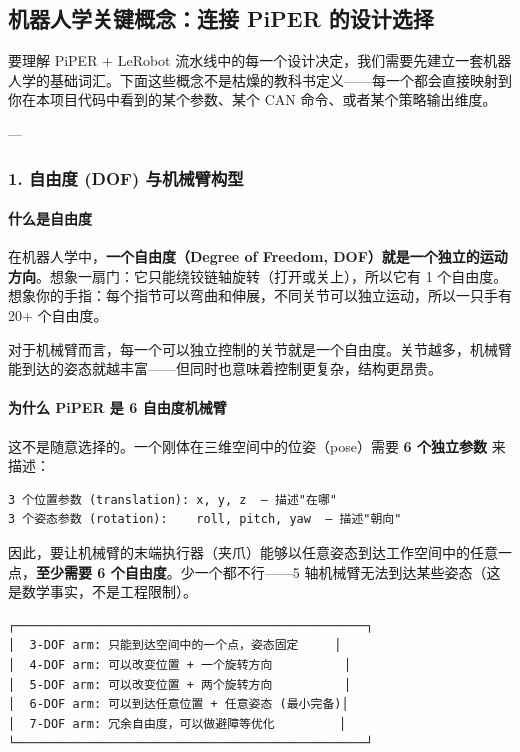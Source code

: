 \documentclass[UTF8,a4paper,11pt]{ctexart}
\begin{document}
\subsection{机器人学关键概念：连接 PiPER 的设计选择}

要理解 PiPER + LeRobot 流水线中的每一个设计决定，我们需要先建立一套机器人学的基础词汇。下面这些概念不是枯燥的教科书定义——每一个都会直接映射到你在本项目代码中看到的某个参数、某个 CAN 命令、或者某个策略输出维度。

---

\subsubsection{1. 自由度 (DOF) 与机械臂构型}

\paragraph{什么是自由度}


在机器人学中，\textbf{一个自由度（Degree of Freedom, DOF）就是一个独立的运动方向}。想象一扇门：它只能绕铰链轴旋转（打开或关上），所以它有 1 个自由度。想象你的手指：每个指节可以弯曲和伸展，不同关节可以独立运动，所以一只手有 20+ 个自由度。

对于机械臂而言，每一个可以独立控制的关节就是一个自由度。关节越多，机械臂能到达的姿态就越丰富——但同时也意味着控制更复杂，结构更昂贵。

\paragraph{为什么 PiPER 是 6 自由度机械臂}


这不是随意选择的。一个刚体在三维空间中的位姿（pose）需要 \textbf{6 个独立参数} 来描述：

\begin{lstlisting}[language=text]
3 个位置参数 (translation): x, y, z  — 描述"在哪"
3 个姿态参数 (rotation):    roll, pitch, yaw  — 描述"朝向"
\end{lstlisting}

因此，要让机械臂的末端执行器（夹爪）能够以任意姿态到达工作空间中的任意一点，\textbf{至少需要 6 个自由度}。少一个都不行——5 轴机械臂无法到达某些姿态（这是数学事实，不是工程限制）。

\begin{lstlisting}[language=text]
┌─────────────────────────────────────────────────┐
│  3-DOF arm: 只能到达空间中的一个点，姿态固定     │
│  4-DOF arm: 可以改变位置 + 一个旋转方向          │
│  5-DOF arm: 可以改变位置 + 两个旋转方向          │
│  6-DOF arm: 可以到达任意位置 + 任意姿态 (最小完备)│
│  7-DOF arm: 冗余自由度，可以做避障等优化         │
└─────────────────────────────────────────────────┘
\end{lstlisting}
\end{document}
